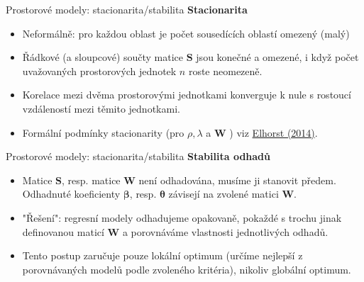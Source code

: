 \documentclass{beamer}
\begin{document}
\begin{frame}{Prostorové modely:  stacionarita/stabilita}
\textbf{Stacionarita}
\begin{itemize}
\item Neformálně: pro každou oblast je počet sousedících oblastí omezený (malý)
\item Řádkové (a sloupcové) součty matice $\bm{S}$ jsou konečné a omezené, i když počet uvažovaných prostorových jednotek $n$ roste neomezeně.
\item Korelace mezi dvěma prostorovými jednotkami konverguje k nule s rostoucí vzdáleností mezi těmito jednotkami.
\item Formální podmínky stacionarity (pro $\rho, \lambda$ a $\bm{W}$ ) viz \href{https://www.google.cz/url?sa=t&rct=j&q=&esrc=s&source=web&cd=1&cad=rja&uact=8&ved=0ahUKEwjjwvLCk8bLAhXEvXIKHWSHBxsQFgggMAA&url=http://www.springer.com/cda/content/document/cda_downloaddocument/9783642403392-c2.pdf?SGWID\%3D0-0-45-1432965-p175381976&usg=AFQjCNGpme8ofJQzd46BCJVsUEio6oKIzQ&sig2=LlarV9wYhELGcTPiqzfRgg}{Elhorst (2014)}.
\end{itemize}
\end{frame}
\begin{frame}{Prostorové modely:  stacionarita/stabilita}
\textbf{Stabilita odhadů}
\begin{itemize}
	\item Matice $\bm{S}$, resp. matice $\bm{W}$ není odhadována, musíme ji stanovit předem. Odhadnuté koeficienty $\bm{\beta}$, resp. $\bm{\theta}$ závisejí na zvolené matici $\bm{W}$.
	\item "Řešení": regresní modely odhadujeme opakovaně, pokaždé s trochu jinak definovanou maticí $\bm{W}$ a porovnáváme vlastnosti jednotlivých odhadů.
    \item Tento postup zaručuje pouze lokální optimum (určíme nejlepší z porovnávaných modelů podle zvoleného kritéria), nikoliv globální optimum.
	\end{itemize}
\end{frame}
\end{document}
